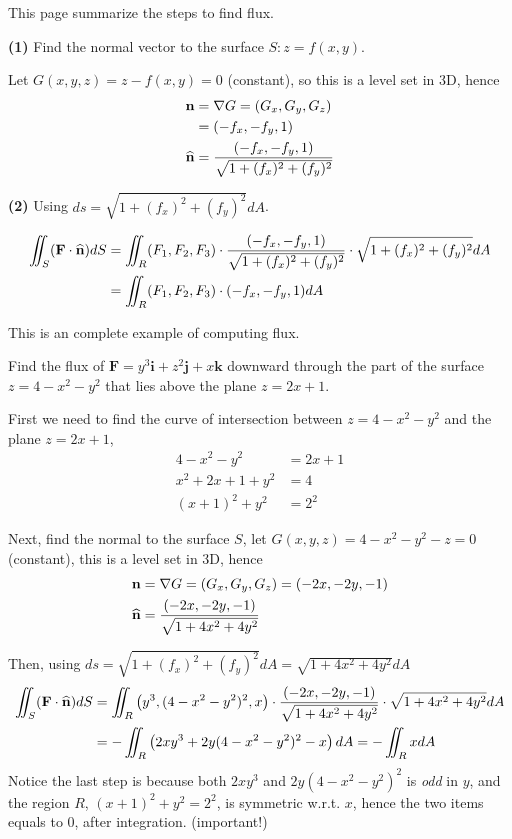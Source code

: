 \begin{spacing}{1.3}
    \newpage
    {\blue This page summarize the steps to find flux.}

    {\bf (1)} Find the normal vector to the surface $S: z=f(x,y)$.

    Let $G(x,y,z)=z-f(x,y)=0$ (constant), so this is a level set in 3D, hence 
    \begin{align*}
        {\bf n} &=\nabla G = (G_x, G_y, G_z)\\
                &= (-f_x, -f_y, 1)\\
        {\widehat{\bf n}}   &= \frac{(-f_x, -f_y, 1)}{\sqrt{1+(f_x)^2+(f_y)^2}}             
    \end{align*}

    {\bf (2)} Using $ds=\sqrt{1+(f_x)^2+(f_y)^2} dA$.

    \begin{align*}
        \iint_S({\bf F}\cdot \widehat{\bf n}) dS &= \iint_R (F_1,F_2,F_3)\cdot 
                        \frac{(-f_x, -f_y, 1)}{\sqrt{1+(f_x)^2+(f_y)^2}} \cdot \sqrt{1+(f_x)^2+(f_y)^2} dA\\
                        &= \iint_R (F_1,F_2,F_3)\cdot (-f_x, -f_y, 1) dA
    \end{align*}

    \vspace{0.4in}
    {\blue This is an complete example of computing flux.}

    \eg Find the flux of $\mathbf{F}=y^{3} \mathbf{i}+z^{2} \mathbf{j}+x \mathbf{k}$ downward through 
    the part of the surface $z=4-x^{2}-y^{2}$ that lies above the plane $z=2 x+1$.
    
    \sol First we need to find the curve of intersection between 
    $z=4-x^2-y^2$ and the plane $z=2x+1$,
    \begin{align*}
        4-x^2-y^2 &= 2x+1\\
        x^2+2x+1+y^2 &= 4\\
        (x+1)^2+y^2 &= 2^2
    \end{align*}

    Next, find the normal to the surface $S$, let $G(x,y,z)=4-x^2-y^2-z=0$ (constant),
    this is a level set in 3D, hence 
    \begin{align*}
        {\bf n} &= \nabla G =(G_x, G_y, G_z) =(-2x, -2y, -1)\\
        {\widehat{\bf n} } &= \frac{(-2x, -2y, -1)}{\sqrt{1+4x^2+4y^2}}
    \end{align*}

    Then, using $ds=\sqrt{1+(f_x)^2+(f_y)^2} dA=\sqrt{1+4x^2+4y^2} dA$
    \begin{align*}
        \iint_S({\bf F}\cdot \widehat{\bf n}) dS &= \iint_R \left(y^3, (4-x^2-y^2)^2, x\right)
            \cdot \frac{(-2x, -2y, -1)}{\sqrt{1+4x^2+4y^2}}\cdot \sqrt{1+4x^2+4y^2} dA\\
            &= -\iint_R \left(2xy^3+2y(4-x^2-y^2)^2-x\right) dA
            = -\iint_R x dA
    \end{align*}
    Notice the last step is because both $2xy^3$ and $2y(4-x^2-y^2)^2$ is {\it odd} in $y$,
    and the region $R$, $(x+1)^2+y^2 = 2^2$, is symmetric w.r.t. $x$, hence the two items 
    equals to 0, after integration. {\blue (important!)}


\end{spacing}
